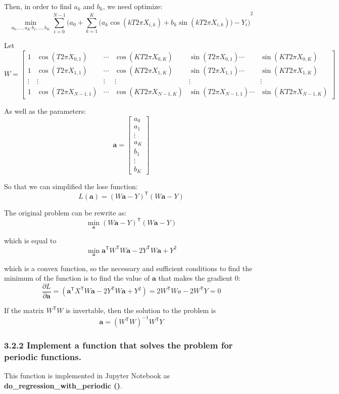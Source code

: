 \documentclass{article}
\newcommand{\V}[1]{\boldsymbol{#1}}
\begin{document}
Then, in order to find \( a_k \) and \( b_k \), we need optimize:
\[ \min\limits_{a_0, \ldots, a_K \ b_1, \ldots, b_K} 
    \sum_{i=0}^{N-1} {\bigg(a_0 + \sum_{k=1}^K \Big(a_k \cos(k T 2 \pi X_{i,k}) + b_k \sin(k T 2 \pi X_{i,k})\Big) - Y_i\bigg)}^2 \]

Let 
\[ W = 
\begin{bmatrix} 
    1 & \cos(T 2 \pi X_{0,1}) & \cdots & \cos(K T 2 \pi X_{0,K}) & \sin(T 2 \pi X_{0,1}) \cdots & \sin(K T 2 \pi X_{0,K}) \\
    1 & \cos(T 2 \pi X_{1,1}) & \cdots & \cos(K T 2 \pi X_{1,K}) & \sin(T 2 \pi X_{1,1}) \cdots & \sin(K T 2 \pi X_{1,K}) \\
    \vdots & \vdots & \vdots & \vdots & \vdots & \vdots  \\
    1 & \cos(T 2 \pi X_{N-1,1}) & \cdots & \cos(K T 2 \pi X_{N-1,K}) & \sin(T 2 \pi X_{N-1,1}) \cdots & \sin(K T 2 \pi X_{N-1,K})
\end{bmatrix} \]

As well as the parameters:
\[ \V{a} =
    \begin{bmatrix}
        a_0 \\
        a_1 \\
        \vdots \\
        a_K \\
        b_1 \\
        \vdots \\
        b_K
    \end{bmatrix} \]

So that we can simplified the lose function:
\[ L(\V{a}) = 
    {(W \V{a} - Y)}^{\mathsf{T}} (W \V{a} - Y) \]

The original problem can be rewrite as:
\[ \min\limits_{\V{a}} {(W \V{a} - Y)}^{\mathsf{T}} (W \V{a} - Y) \]

which is equal to
\[ \min_{\V{a}} {\V{a}}^{\mathsf{T}} W^{\mathsf{T}} W \V{a} - 2 Y^{\mathsf{T}} W \V{a} + Y^2 \]

which is a convex function, so the necessary and sufficient conditions to find the minimum of the function is to find the value of \( \V{a} \) that makes the gradient 0:
\[ \frac{\partial L}{\partial \V{a}} = \left(\V{a}^\mathsf{T} X^\mathsf{T} W \V{a} - 2 Y^\mathsf{T} W \V{a} + Y^2 \right) = 2 W^\mathsf{T} W a - 2W^\mathsf{T} Y = 0 \]

If the matrix \( W^\mathsf{T}W \) is invertable, then the solution to the problem is
\[ \V{a} = {(W^\mathsf{T} W)}^{-1} W^\mathsf{T} Y \]

\subsubsection*{3.2.2 Implement a function that solves the problem for periodic functions.}
This function is implemented in Jupyter Notebook as \textbf{do\_regression\_with\_periodic ()}.
\end{document}
